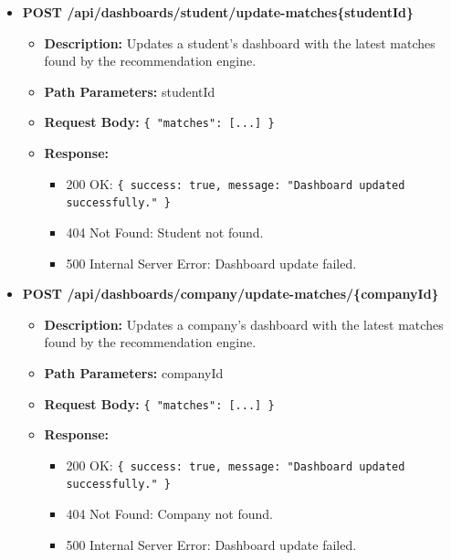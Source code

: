 \begin{itemize}
    \item \textbf{POST /api/dashboards/student/update-matches\{studentId\}}  
    \begin{itemize}
        \item \textbf{Description:} Updates a student's dashboard with the latest matches found by the recommendation engine.
        \item \textbf{Path Parameters:} studentId  
        \item \textbf{Request Body:} 
        \texttt{\{ 
            "matches": [...] 
        \}}
        \item \textbf{Response:}
        \begin{itemize}
            \item 200 OK: \texttt{\{ success: true, message: "Dashboard updated successfully." \}}
            \item 404 Not Found: Student not found.
            \item 500 Internal Server Error: Dashboard update failed.
        \end{itemize}
    \end{itemize}

    \item \textbf{POST /api/dashboards/company/update-matches/\{companyId\}}  
    \begin{itemize}
        \item \textbf{Description:} Updates a company's dashboard with the latest matches found by the recommendation engine.
        \item \textbf{Path Parameters:} companyId  
        \item \textbf{Request Body:} 
        \texttt{\{ 
            "matches": [...] 
        \}}
        \item \textbf{Response:}
        \begin{itemize}
            \item 200 OK: \texttt{\{ success: true, message: "Dashboard updated successfully." \}}
            \item 404 Not Found: Company not found.
            \item 500 Internal Server Error: Dashboard update failed.
        \end{itemize}
    \end{itemize}


\end{itemize}
